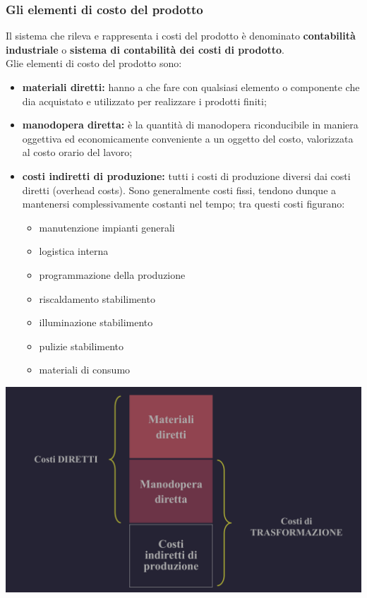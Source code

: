 \documentclass{article}
\begin{document}
\subsubsection{Gli elementi di costo del prodotto}
Il sistema che rileva e rappresenta i costi del prodotto è denominato \textbf{contabilità industriale} o \textbf{sistema di contabilità dei costi di prodotto}.
\vspace*{0.2cm}\\
Glie elementi di costo del prodotto sono:
\begin{itemize}
    \item \textbf{materiali diretti:} hanno a che fare con qualsiasi elemento o componente  che dia acquistato e utilizzato per realizzare i prodotti finiti;
    \item \textbf{manodopera diretta:} è la quantità di manodopera riconducibile in maniera oggettiva ed economicamente conveniente a un oggetto del costo, valorizzata al costo orario del lavoro;
    \item \textbf{costi indiretti di produzione:} tutti i costi di produzione diversi dai costi diretti (overhead costs). Sono generalmente costi fissi, tendono dunque a mantenersi complessivamente costanti nel tempo; tra questi costi figurano:
    \begin{itemize}
        \item manutenzione impianti generali
        \item logistica interna
        \item programmazione della produzione
        \item riscaldamento stabilimento
        \item illuminazione stabilimento
        \item pulizie stabilimento
        \item materiali di consumo
    \end{itemize}
\end{itemize}
\begin{center}
    \includegraphics[scale=0.22]{Image/ElemCosto_1.png}
\end{center}
\end{document}
